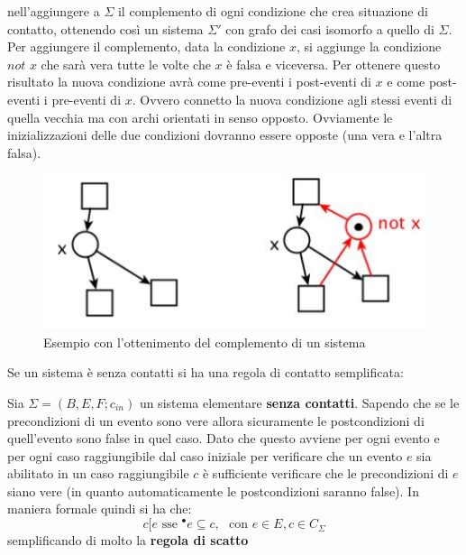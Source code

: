 \documentclass[a4paper,12pt, oneside]{book}
\begin{document}
nell'aggiungere a $\Sigma$ il complemento di ogni condizione che crea situazione
di contatto, ottenendo così un sistema $\Sigma'$ con grafo dei casi isomorfo a
quello di $\Sigma$.\\ 
Per aggiungere il complemento, data la condizione $x$, si aggiunge la condizione
$not\,\, x$ che sarà vera tutte le volte che $x$ è falsa e viceversa. Per
ottenere questo risultato la nuova condizione avrà come pre-eventi i
post-eventi di $x$ e come post-eventi i pre-eventi di $x$. Ovvero
connetto la nuova condizione agli stessi eventi di quella vecchia ma con archi
orientati in senso opposto. Ovviamente le inizializzazioni delle due condizioni
dovranno essere opposte (una vera e l'altra falsa).
\begin{figure}[H]
  \centering
  \includegraphics[scale = 0.6]{img/con2.jpg}
  \caption{Esempio con l'ottenimento del complemento di un sistema}
\end{figure}
Se un sistema è senza contatti si ha una regola di contatto semplificata:
\begin{definizione}
  Sia $\Sigma = (B,E,F;c_{in})$ un sistema elementare \textbf{senza
    contatti}. Sapendo che se le precondizioni di un evento sono vere allora
  sicuramente le postcondizioni di quell'evento sono false in quel caso. Dato
  che questo avviene per ogni evento e per ogni caso raggiungibile dal caso
  iniziale per verificare che un evento $e$ sia abilitato in un caso
  raggiungibile $c$ è sufficiente verificare che le precondizioni di $e$ siano
  vere (in quanto automaticamente le postcondizioni saranno false). In
  maniera formale quindi si ha che: 
  \[c[e\mbox{ sse } ^\bullet e\subseteq c,\,\,\mbox{ con } e\in E,c\in
    C_\Sigma\]
  semplificando di molto la \textbf{regola di scatto}
\end{definizione}
\end{document}
